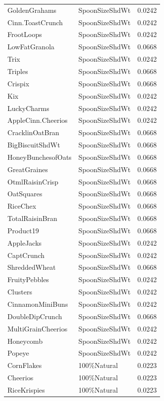 \begin{longtable}{llr}
GoldenGrahams & SpoonSizeShdWt & 0.0242 \\
Cinn.ToastCrunch & SpoonSizeShdWt & 0.0242 \\
FrootLoops & SpoonSizeShdWt & 0.0242 \\
LowFatGranola & SpoonSizeShdWt & 0.0668 \\
Trix & SpoonSizeShdWt & 0.0242 \\
Triples & SpoonSizeShdWt & 0.0668 \\
Crispix & SpoonSizeShdWt & 0.0668 \\
Kix & SpoonSizeShdWt & 0.0242 \\
LuckyCharms & SpoonSizeShdWt & 0.0242 \\
AppleCinn.Cheerios & SpoonSizeShdWt & 0.0242 \\
CracklinOatBran & SpoonSizeShdWt & 0.0668 \\
BigBiscuitShdWt & SpoonSizeShdWt & 0.0668 \\
HoneyBunchesofOats & SpoonSizeShdWt & 0.0668 \\
GreatGraines & SpoonSizeShdWt & 0.0668 \\
OtmlRaisinCrisp & SpoonSizeShdWt & 0.0668 \\
OatSquares & SpoonSizeShdWt & 0.0668 \\
RiceChex & SpoonSizeShdWt & 0.0668 \\
TotalRaisinBran & SpoonSizeShdWt & 0.0668 \\
Product19 & SpoonSizeShdWt & 0.0668 \\
AppleJacks & SpoonSizeShdWt & 0.0242 \\
CaptCrunch & SpoonSizeShdWt & 0.0242 \\
ShreddedWheat & SpoonSizeShdWt & 0.0668 \\
FruityPebbles & SpoonSizeShdWt & 0.0242 \\
Clusters & SpoonSizeShdWt & 0.0242 \\
CinnamonMiniBuns & SpoonSizeShdWt & 0.0242 \\
DoubleDipCrunch & SpoonSizeShdWt & 0.0668 \\
MultiGrainCheerios & SpoonSizeShdWt & 0.0242 \\
Honeycomb & SpoonSizeShdWt & 0.0242 \\
Popeye & SpoonSizeShdWt & 0.0242 \\
CornFlakes & 100\%Natural & 0.0223 \\
Cheerios & 100\%Natural & 0.0223 \\
RiceKrispies & 100\%Natural & 0.0223 \\

\end{longtable}
